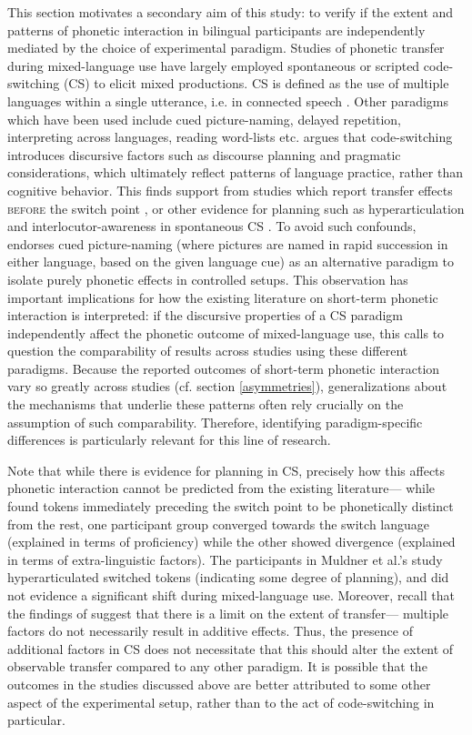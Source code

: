 \documentclass[12 pt]{article}
\begin{document}
This section motivates a secondary aim of this study: to verify if the extent and patterns of phonetic interaction in bilingual participants are independently mediated by the choice of experimental paradigm. Studies of phonetic transfer during mixed-language use have largely employed spontaneous or scripted code-switching (CS) to elicit mixed productions. CS is defined as the use of multiple languages within a single utterance, i.e. in connected speech \citep{myers1993dueling}. Other paradigms which have been used include cued picture-naming, delayed repetition, interpreting across languages, reading word-lists etc. \cite{olson2013bilingual} argues that code-switching introduces discursive factors such as discourse planning and pragmatic considerations, which ultimately reflect patterns of language practice, rather than cognitive behavior. This finds support from studies which report transfer effects \textsc{before} the switch point \citep{bullock2009trying}, or other evidence for planning such as hyperarticulation \citep{muldner2019phonetics} and interlocutor-awareness in spontaneous CS \citep{khattab2013phonetic}. To avoid such confounds, \cite{olson2013bilingual} endorses cued picture-naming (where pictures are named in rapid succession in either language, based on the given language cue) as an alternative paradigm to isolate purely phonetic effects in controlled setups. This observation has important implications for how the existing literature on short-term phonetic interaction is interpreted: if the discursive properties of a CS paradigm independently affect the phonetic outcome of mixed-language use, this calls to question the comparability of results across studies using these different paradigms. Because the reported outcomes of short-term phonetic interaction vary so greatly across studies (cf. section \ref{asymmetries}), generalizations about the mechanisms that underlie these patterns often rely crucially on the assumption of such comparability. Therefore, identifying paradigm-specific differences is particularly relevant for this line of research.

Note that while there is evidence for planning in CS, precisely how this affects phonetic interaction cannot be predicted from the existing literature--- while \cite{bullock2009trying} found tokens immediately preceding the switch point to be phonetically distinct from the rest, one participant group converged towards the switch language (explained in terms of proficiency) while the other showed divergence (explained in terms of extra-linguistic factors). The participants in Muldner et al.'s \citeyearpar{muldner2019phonetics} study hyperarticulated switched tokens (indicating some degree of planning), and did not evidence a significant shift during mixed-language use. Moreover, recall that the findings of \cite{olson2016role} suggest that there is a limit on the extent of transfer--- multiple factors do not necessarily result in additive effects. Thus, the presence of additional factors in CS does not necessitate that this should alter the extent of observable transfer compared to any other paradigm. It is possible that the outcomes in the studies discussed above are better attributed to some other aspect of the experimental setup, rather than to the act of code-switching in particular.
\end{document}
